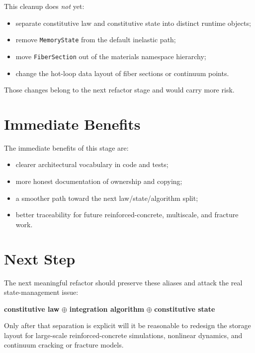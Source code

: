 This cleanup does \emph{not} yet:
\begin{itemize}
  \item separate constitutive law and constitutive state into distinct runtime
        objects;
  \item remove \texttt{MemoryState} from the default inelastic path;
  \item move \texttt{FiberSection} out of the materials namespace hierarchy;
  \item change the hot-loop data layout of fiber sections or continuum points.
\end{itemize}

Those changes belong to the next refactor stage and would carry more risk.

\section{Immediate Benefits}

The immediate benefits of this stage are:
\begin{itemize}
  \item clearer architectural vocabulary in code and tests;
  \item more honest documentation of ownership and copying;
  \item a smoother path toward the next law/state/algorithm split;
  \item better traceability for future reinforced-concrete, multiscale, and
        fracture work.
\end{itemize}

\section{Next Step}

The next meaningful refactor should preserve these aliases and attack the real
state-management issue:
\begin{center}
\textbf{constitutive law}
\(\oplus\)
\textbf{integration algorithm}
\(\oplus\)
\textbf{constitutive state}
\end{center}

Only after that separation is explicit will it be reasonable to redesign the
storage layout for large-scale reinforced-concrete simulations, nonlinear
dynamics, and continuum cracking or fracture models.
